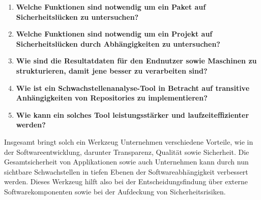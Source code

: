    \begin{enumerate}
        \item \textbf{Welche Funktionen sind notwendig um ein Paket auf Sicherheitslücken zu untersuchen?} \label{q:one}
        \item \textbf{Welche Funktionen sind notwendig um ein Projekt auf Sicherheitslücken durch Abhängigkeiten zu untersuchen?} \label{q:two}
        \item \textbf{Wie sind die Resultatdaten für den Endnutzer sowie Maschinen zu strukturieren, damit jene besser zu verarbeiten sind?} \label{q:three}
        \item \textbf{Wie ist ein Schwachstellenanalyse-Tool in Betracht auf transitive Anhängigkeiten von Repositories zu implementieren?} \label{q:four}
        \item \textbf{Wie kann ein solches Tool leistungsstärker und laufzeiteffizienter werden?} \label{q:five}
    \end{enumerate}
    Insgesamt bringt solch ein Werkzeug Unternehmen verschiedene Vorteile, wie in der Softwareentwicklung, darunter Transparenz, Qualität sowie Sicherheit.
    Die Gesamtsicherheit von Applikationen sowie auch Unternehmen kann durch nun sichtbare Schwachstellen in tiefen Ebenen der Softwareabhängigkeit verbessert werden.
    Dieses Werkzeug hilft also bei der Entscheidungsfindung über externe Softwarekomponenten sowie bei der Aufdeckung von Sicherheitsrisiken.
    